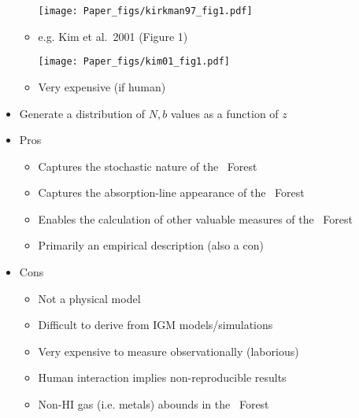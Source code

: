 \documentclass[12pt,letterpaper]{article}
\begin{document}
\begin{Aenumerate}
\begin{itemize}
\begin{itemize}
	\texttt{[image: Paper\_figs/kirkman97\_fig1.pdf]}

  	\item e.g. Kim et al.\ 2001 (Figure 1)

	\texttt{[image: Paper\_figs/kim01\_fig1.pdf]}

  	\item Very expensive (if human)

  	\end{itemize}
  \item Generate a distribution of $N,b$ values as a function of $z$
  \item Pros
  	\begin{itemize}
  	\item Captures the stochastic nature of the \lya\ Forest
  	\item Captures the absorption-line appearance of the \lya\ Forest
  	\item Enables the calculation of other valuable measures of the \lya\ Forest
  	\item Primarily an empirical description (also a con)
  	\end{itemize}
  \item Cons
  	\begin{itemize}
  	\item Not a physical model
  	\item Difficult to derive from IGM models/simulations
  	\item Very expensive to measure observationally (laborious)
  	\item Human interaction implies non-reproducible results
  	\item Non-HI gas (i.e. metals) abounds in the \lya\ Forest
  	\end{itemize}
 \end{itemize}


\end{Aenumerate}
\end{document}
